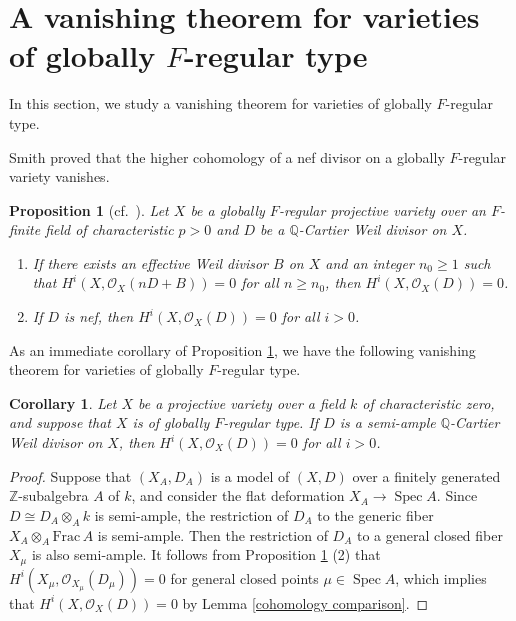 \documentclass[12pt]{amsart}
\def\ge{\geqslant}
\def\Spec{\operatorname{Spec}}
\newcommand{\Q}{\mathbb{Q}}
\newcommand{\Z}{\mathbb{Z}}
\newcommand{\sO}{\mathcal{O}}
\theoremstyle{plain}
\newtheorem{cor}[thm]{Corollary}
\newtheorem{prop}[thm]{Proposition}
\theoremstyle{definition}
\theoremstyle{remark}
\newtheorem{defn and notation}[thm]{Definition and Notation}
\theoremstyle{plain}
\begin{document}
\section{A vanishing theorem for varieties of globally ${F}$-regular type}\label{vanishing section}

In this section, we study a vanishing theorem for varieties of globally $F$-regular type. 

Smith \cite{Smith00} proved that the higher cohomology of a nef divisor on a globally $F$-regular variety vanishes. 

\begin{prop}[\textup{cf.~\cite[Theorem 4.2 (2), Corollary 4.3]{Smith00}}]\label{thm:nef vanishing for GFR}
    Let $X$ be a globally $F$-regular projective variety over an $F$-finite field of characteristic $p>0$ and $D$ be a $\Q$-Cartier Weil divisor on $X$. 
\begin{enumerate}[label=$(\arabic*)$]
    \item If there exists an effective Weil divisor $B$ on $X$ and an integer $n_0 \ge 1$ such that $H^i(X, \sO_X(nD+B))=0$ for all $n \ge n_0$, then $H^i(X, \sO_X(D))=0$. 
    \item If $D$ is nef, then $H^i(X,\sO_X(D))=0$ for all $i>0$.
\end{enumerate}
\end{prop}

As an immediate corollary of Proposition \ref{thm:nef vanishing for GFR}, we have the following vanishing theorem for varieties of globally $F$-regular type. 
\begin{cor}\label{kodaira vanishing}
Let $X$ be a projective variety over a field $k$ of characteristic zero, and suppose that $X$ is of globally $F$-regular type.   
If $D$ is a semi-ample $\Q$-Cartier Weil divisor on $X$, then $H^i(X, \sO_X(D))=0$ for all $i>0$. 
\end{cor}

\begin{proof}
Suppose that $(X_A, D_A)$ is a model of $(X,D)$ over a finitely generated $\Z$-subalgebra $A$ of $k$, and consider the flat deformation $X_A \to \Spec A$. 
Since $D \cong D_A \otimes_A k$ is semi-ample, the restriction of $D_A$ to the generic fiber $X_A \otimes_A \mathrm{Frac}\, A$ is semi-ample. 
Then the restriction of $D_A$ to a general closed fiber $X_{\mu}$ is also semi-ample. 
It follows from Proposition \ref{thm:nef vanishing for GFR} (2) that $H^i(X_{\mu}, \sO_{X_{\mu}}(D_{\mu}))=0$ for general closed points $\mu \in \Spec A$, which implies that $H^i(X, \sO_X(D))=0$ by Lemma \ref{cohomology comparison}. 
\end{proof}
\end{document}
